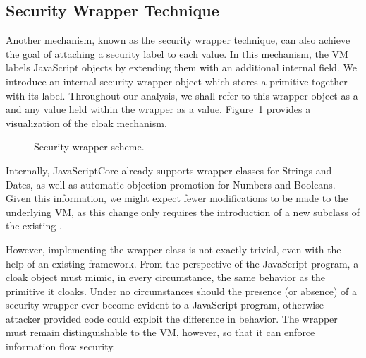 \subsection{Security Wrapper Technique}\label{sec:cloaks}

Another mechanism, known as the security wrapper technique, can also achieve the goal of attaching a security label to each value.
In this mechanism, the VM labels JavaScript objects by extending them with an additional internal field.
We introduce an internal security wrapper object which stores a primitive together with its label.
Throughout our analysis, we shall refer to this wrapper object as a  and any value held within the wrapper as a  value.
Figure~\ref{fig:security-wrapper} provides a visualization of the cloak mechanism.

\begin{figure}[h]
 \centering
{}
\caption{Security wrapper scheme.}
\label{fig:security-wrapper}
\end{figure}

Internally, JavaScriptCore already supports wrapper classes for Strings and Dates, as well as automatic objection promotion for Numbers and Booleans.
Given this information, we might expect fewer modifications to be made to the underlying VM, as this change only requires the introduction of a new subclass of the existing .

However, implementing the wrapper class is not exactly trivial, even with the help of an existing framework.
From the perspective of the JavaScript program, a cloak object must mimic, in every circumstance, the same behavior as the primitive it cloaks.
Under no circumstances should the presence (or absence) of a security wrapper ever become evident to a JavaScript program, otherwise attacker provided code could exploit the difference in behavior.
The wrapper must remain distinguishable to the VM, however, so that it can enforce information flow security.

